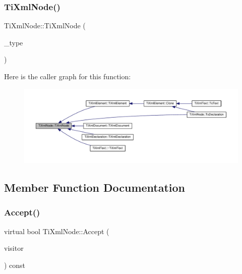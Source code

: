 \mbox{\label{class_ti_xml_node_a3f46721695868667113c7487ff123f20}} 
\subsubsection{\texorpdfstring{Ti\+Xml\+Node()}{TiXmlNode()}}
{\footnotesize\ttfamily Ti\+Xml\+Node\+::\+Ti\+Xml\+Node (\begin{DoxyParamCaption}\item[{\hyperlink{class_ti_xml_node_a836eded4920ab9e9ef28496f48cd95a2}{Node\+Type}}]{\+\_\+type }\end{DoxyParamCaption})\hspace{0.3cm}{\ttfamily [protected]}}

Here is the caller graph for this function\+:\nopagebreak
\begin{figure}[H]
\begin{center}
\leavevmode
\includegraphics[width=350pt]{class_ti_xml_node_a3f46721695868667113c7487ff123f20_icgraph}
\end{center}
\end{figure}


\subsection{Member Function Documentation}
\mbox{\label{class_ti_xml_node_acc0f88b7462c6cb73809d410a4f5bb86}} 
\subsubsection{\texorpdfstring{Accept()}{Accept()}}
{\footnotesize\ttfamily virtual bool Ti\+Xml\+Node\+::\+Accept (\begin{DoxyParamCaption}\item[{\hyperlink{class_ti_xml_visitor}{Ti\+Xml\+Visitor} $\ast$}]{visitor }\end{DoxyParamCaption}) const\hspace{0.3cm}{\ttfamily [pure virtual]}}

